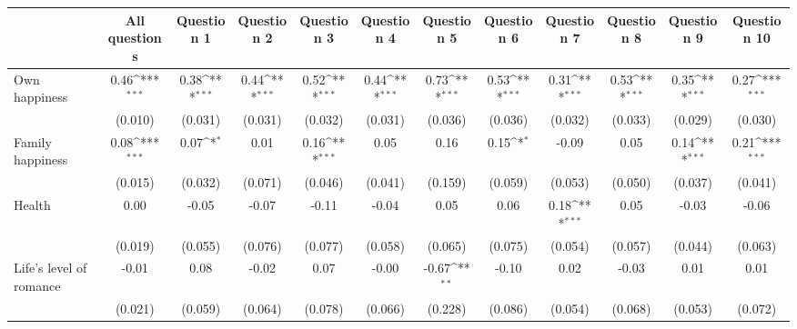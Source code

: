 {
\def\sym#1{\ifmmode^{#1}\else\(^{#1}\)\fi}
\begin{tabular}{l*{11}{c}}
\hline\hline
                &\multicolumn{1}{c}{All questions}&\multicolumn{1}{c}{Question 1}&\multicolumn{1}{c}{Question 2}&\multicolumn{1}{c}{Question 3}&\multicolumn{1}{c}{Question 4}&\multicolumn{1}{c}{Question 5}&\multicolumn{1}{c}{Question 6}&\multicolumn{1}{c}{Question 7}&\multicolumn{1}{c}{Question 8}&\multicolumn{1}{c}{Question 9}&\multicolumn{1}{c}{Question 10}\\
\hline
Own happiness   &     0.46\sym{***}&     0.38\sym{***}&     0.44\sym{***}&     0.52\sym{***}&     0.44\sym{***}&     0.73\sym{***}&     0.53\sym{***}&     0.31\sym{***}&     0.53\sym{***}&     0.35\sym{***}&     0.27\sym{***}\\
                &  (0.010)         &  (0.031)         &  (0.031)         &  (0.032)         &  (0.031)         &  (0.036)         &  (0.036)         &  (0.032)         &  (0.033)         &  (0.029)         &  (0.030)         \\
[1em]
Family happiness&     0.08\sym{***}&     0.07\sym{*}  &     0.01         &     0.16\sym{***}&     0.05         &     0.16         &     0.15\sym{*}  &    -0.09         &     0.05         &     0.14\sym{***}&     0.21\sym{***}\\
                &  (0.015)         &  (0.032)         &  (0.071)         &  (0.046)         &  (0.041)         &  (0.159)         &  (0.059)         &  (0.053)         &  (0.050)         &  (0.037)         &  (0.041)         \\
[1em]
Health          &     0.00         &    -0.05         &    -0.07         &    -0.11         &    -0.04         &     0.05         &     0.06         &     0.18\sym{***}&     0.05         &    -0.03         &    -0.06         \\
                &  (0.019)         &  (0.055)         &  (0.076)         &  (0.077)         &  (0.058)         &  (0.065)         &  (0.075)         &  (0.054)         &  (0.057)         &  (0.044)         &  (0.063)         \\
[1em]
Life's level of romance&    -0.01         &     0.08         &    -0.02         &     0.07         &    -0.00         &    -0.67\sym{**} &    -0.10         &     0.02         &    -0.03         &     0.01         &     0.01         \\
                &  (0.021)         &  (0.059)         &  (0.064)         &  (0.078)         &  (0.066)         &  (0.228)         &  (0.086)         &  (0.054)         &  (0.068)         &  (0.053)         &  (0.072)         \\

\end{tabular}}

